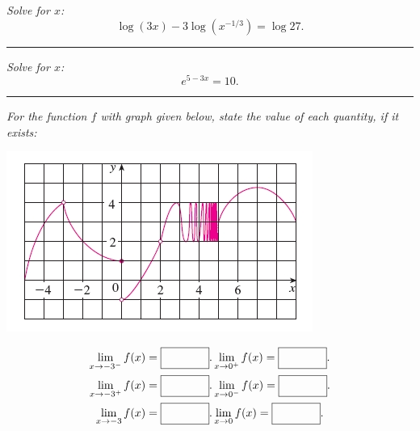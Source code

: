 \documentclass[12pt]{article}
\begin{document}
\bigskip
{\problem[5 pts] \em Solve for $x$:} \begin{equation*}\log (3x) - 3 \log (x^{-1/3}) =
  \log 27.\end{equation*}
\vspace{2cm}
\begin{flushright}
\end{flushright}
\hrule
{\problem[5 pts] \em Solve for $x$:} 
\begin{equation*}e^{5-3x} = 10.\end{equation*}
\vspace{2cm}
\begin{flushright}
\end{flushright}
\hrule
{\problem[10 pts] \em For the function $f$ with graph given below, state the value of each quantity, if it exists:}
\begin{center} 
\includegraphics[width=0.5\linewidth]{gftest1.JPG}
\end{center}
\begin{eqnarray*}
\lim_{x\to -3^-} f(x)= \fbox{\hspace{0.5in}\strut}. & \lim_{x\to 0^+} f(x)= \fbox{\hspace{0.5in}\strut}. \\
\lim_{x\to -3^+} f(x)= \fbox{\hspace{0.5in}\strut}. & \lim_{x\to 0^-} f(x)=\fbox{\hspace{0.5in}\strut}. \\
\lim_{x\to -3} f(x)  = \fbox{\hspace{0.5in}\strut}.& \lim_{x \to 0} f(x)= \fbox{\hspace{0.5in}\strut}.
\end{eqnarray*}
\end{document}
